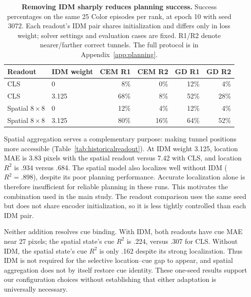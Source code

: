 \begin{table}[!htbp]
\centering
\caption{\textbf{Removing IDM sharply reduces planning success.}
Success percentages on the same 25 Color episodes per rank, at epoch 10
with seed 3072. Each readout's IDM pair shares initialization and differs
only in loss weight; solver settings and evaluation cases are fixed.
R1/R2 denote nearer/farther correct tunnels. The full protocol is in
Appendix~\ref{app:planning}.}
\label{tab:idmplanning}
\renewcommand{\arraystretch}{1.12}
\begin{tabular*}{\linewidth}{@{\extracolsep{\fill}}llrrrr@{}}
\toprule
Readout & IDM weight & CEM R1 & CEM R2 & GD R1 & GD R2 \\
\midrule
CLS & 0 & 8\% & 0\% & 12\% & 4\% \\
CLS & 3.125 & 68\% & 8\% & 52\% & 28\% \\
Spatial $8\!\times\!8$ & 0 & 12\% & 4\% & 12\% & 4\% \\
Spatial $8\!\times\!8$ & 3.125 & 80\% & 16\% & 64\% & 52\% \\
\bottomrule
\end{tabular*}
\end{table}

Spatial aggregation serves a complementary purpose: making tunnel positions
more accessible (Table~\ref{tab:historicalreadout}). At IDM weight 3.125,
location MAE is 3.83 pixels with the spatial readout versus 7.42 with CLS,
and location $R^2$ is .934 versus .684. The spatial model also localizes
well without IDM ($R^2=.898$), despite its poor planning performance.
Accurate localization alone is therefore insufficient for reliable planning
in these runs. This motivates the combination used in the main study.
The readout comparison uses the same seed but does not share encoder
initialization, so it is less tightly controlled than each IDM pair.

Neither addition resolves cue binding. With IDM, both readouts have cue
MAE near 27 pixels; the spatial state's cue $R^2$ is .224, versus .307
for CLS. Without IDM, the spatial state's cue $R^2$ is only .162 despite
its strong localization. Thus IDM is not required for the selective
location--cue gap to appear, and spatial aggregation does not by itself
restore cue identity. These one-seed results support our configuration
choices without establishing that either adaptation is universally necessary.

